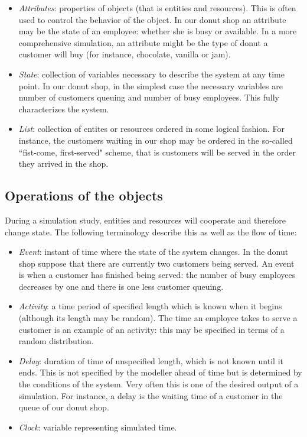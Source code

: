 \documentclass[
]{book}
\begin{document}
\begin{itemize}
\item
  \emph{Attributes}: properties of objects (that is entities and resources). This is often used to control the behavior of the object. In our donut shop an attribute may be the state of an employee: whether she is busy or available. In a more comprehensive simulation, an attribute might be the type of donut a customer will buy (for instance, chocolate, vanilla or jam).
\item
  \emph{State}: collection of variables necessary to describe the system at any time point. In our donut shop, in the simplest case the necessary variables are number of customers queuing and number of busy employees. This fully characterizes the system.
\item
  \emph{List}: collection of entites or resources ordered in some logical fashion. For instance, the customers waiting in our shop may be ordered in the so-called ``fist-come, first-served" scheme, that is customers will be served in the order they arrived in the shop.
\end{itemize}

\hypertarget{operations-of-the-objects}{%
\subsection{Operations of the objects}\label{operations-of-the-objects}}

During a simulation study, entities and resources will cooperate and therefore change state. The following terminology describe this as well as the flow of time:

\begin{itemize}
\item
  \emph{Event}: instant of time where the state of the system changes. In the donut shop suppose that there are currently two customers being served. An event is when a customer has finished being served: the number of busy employees decreases by one and there is one less customer queuing.
\item
  \emph{Activity}: a time period of specified length which is known when it begins (although its length may be random). The time an employee takes to serve a customer is an example of an activity: this may be specified in terms of a random distribution.
\item
  \emph{Delay}: duration of time of unspecified length, which is not known until it ends. This is not specified by the modeller ahead of time but is determined by the conditions of the system. Very often this is one of the desired output of a simulation. For instance, a delay is the waiting time of a customer in the queue of our donut shop.
\item
  \emph{Clock}: variable representing simulated time.
\end{itemize}
\end{document}
